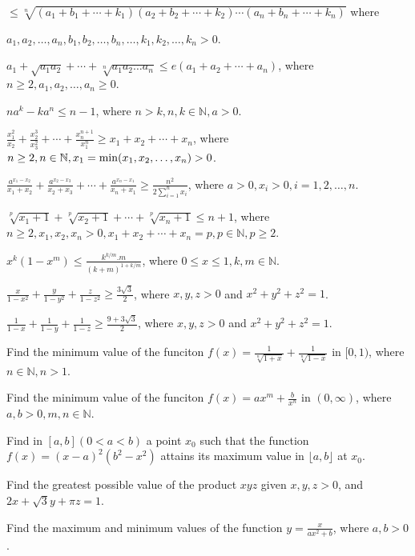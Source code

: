  $\leq\sqrt[n]{(a_1 + b_1 + \cdots + k_1)(a_2 + b_2 + \cdots + k_2)\cdots(a_n + b_n + \cdots + k_n)}$ where

  $a_1, a_2,\ldots, a_n, b_1, b_2, \ldots, b_n, \ldots, k_1, k_2, \ldots, k_n > 0$.
\item $a_1 + \sqrt{a_1a_2} + \cdots + \sqrt[n]{a_1a_2\ldots a_n}\leq e(a_1 + a_2 + \cdots + a_n)$, where $n\geq 2, a_1, a_2,
  \ldots, a_n\geq 0$.
\item $na^k - ka^n\leq n - 1$, where $n > k, n, k\in\mathbb{N}, a > 0$.
\item $\frac{x_1^2}{x_2} + \frac{x_2^3}{x_3^2} + \cdots + \frac{x_n^{n + 1}}{x_1^n}\geq x_1 + x_2 + \cdots + x_n$, where $n\geq 2,
  n\in\mathbb{N}, x_1 = {\rm min}(x_1, x_2, \ldots, x_n) > 0$.
\item $\frac{a^{x_1 - x_2}}{x_1 + x_2} + \frac{a^{x_2 - x_3}}{x_2 + x_3} + \cdots + \frac{a^{x_n - x_1}}{x_n +
  x_1}\geq \frac{n^2}{2\displaystyle\sum_{i=1}^nx_i}$, where $a > 0, x_i > 0, i = 1, 2, \ldots, n$.
\item $\sqrt[p]{x_1 + 1} + \sqrt[p]{x_2 + 1} + \cdots + \sqrt[p]{x_n + 1}\leq n + 1$, where $n\geq 2, x_1, x_2, x_n > 0, x_1 + x_2
  + \cdots + x_n = p, p\in\mathbb{N}, p\geq 2$.
\item $x^k(1 - x^m)\leq \frac{k^{k/m}.m}{(k + m)^{1 + k/m}}$, where $0\leq x\leq 1, k, m\in\mathbb{N}$.
\item $\frac{x}{1 - x^2} + \frac{y}{1 - y^2} + \frac{z}{1 - z^2}\geq \frac{3\sqrt{3}}{2}$, where $x, y, z > 0$ and $x^2 + y^2 + z^2
  = 1$.
\item $\frac{1}{1 - x} + \frac{1}{1 - y} + \frac{1}{1 - z}\geq \frac{9 + 3\sqrt{3}}{2}$, where $x, y, z > 0$ and $x^2 + y^2 + z^2
  = 1$.
\item Find the minimum value of the funciton $f(x) = \frac{1}{\sqrt[n]{1 + x}} + \frac{1}{\sqrt[n]{1 - x}}$ in $[0, 1)$, where
  $n\in\mathbb{N}, n > 1$.
\item Find the minimum value of the funciton $f(x) = ax^m + \frac{b}{x^n}$ in $(0, \infty)$, where $a, b > 0, m, n\in\mathbb{N}$.
\item Find in $[a, b] (0 < a < b)$ a point $x_0$ such that the function $f(x) = (x - a)^2(b^2 - x^2)$ attains its maximum value in
  $\lfloor a, b\rfloor$ at $x_0$.
\item Find the greatest possible value of the product $xyz$ given $x, y, z > 0$, and $2x + \sqrt{3}y + \pi z = 1$.
\item Find the maximum and minimum values of the function $y = \frac{x}{ax^2 + b}$, where $a, b > 0$.
